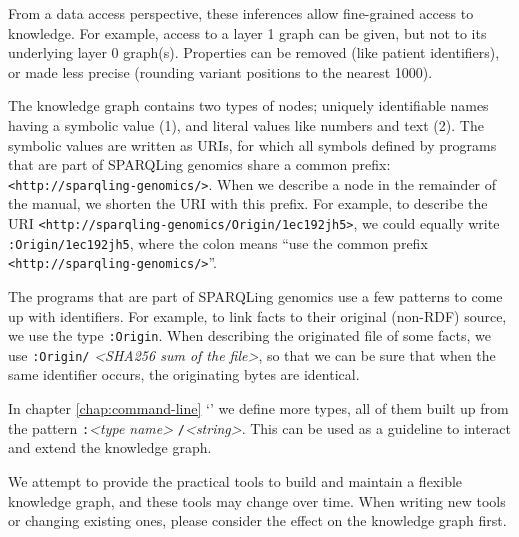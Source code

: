   From a data access perspective, these inferences allow fine-grained access
  to knowledge.  For example, access to a layer 1 graph can be given, but
  not to its underlying layer 0 graph(s).  Properties can be removed (like
  patient identifiers), or made less precise (rounding variant positions to
  the nearest 1000).

  \begin{sloppypar}
  The knowledge graph contains two types of nodes; uniquely identifiable
  names having a symbolic value (1), and literal values like numbers and
  text (2).  The symbolic values are written as URIs, for which all symbols
  defined by programs that are part of SPARQLing genomics share a common
  prefix: \texttt{<http://sparqling-genomics/>}.  When we describe a node
  in the remainder of the manual, we shorten the URI with this prefix.
  For example, to describe the URI
  \texttt{<http://sparqling-genomics/Origin/1ec192jh5>}, we could equally
  write \texttt{:Origin/1ec192jh5}, where the colon means ``use the
  common prefix \texttt{<http://sparqling-genomics/>}''.
  \end{sloppypar}

  The programs that are part of SPARQLing genomics use a few patterns to
  come up with identifiers.  For example, to link facts to their original
  (non-RDF) source, we use the type \texttt{:Origin}.  When describing the
  originated file of some facts, we use \texttt{:Origin/}%
  \emph{<SHA256 sum of the file>}, so that we can be sure that when the
  same identifier occurs, the originating bytes are identical.

  In chapter \ref{chap:command-line}
  {\color{LinkGray}`'} we define more types,
  all of them built up from the pattern \texttt{:}\emph{<type name>}%
  \texttt{/}\emph{<string>}.  This can be used as a guideline to interact
  and extend the knowledge graph.

  We attempt to provide the practical tools to build and maintain a flexible
  knowledge graph, and these tools may change over time.  When writing new
  tools or changing existing ones, please consider the effect on the knowledge
  graph first.

